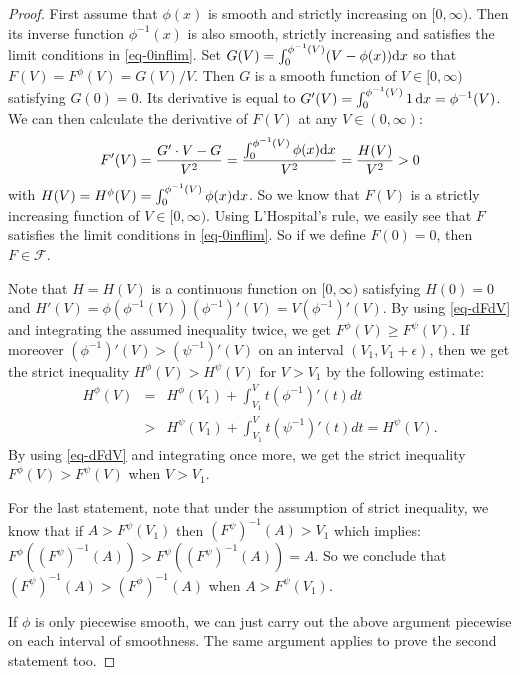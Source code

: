 \documentclass[12pt]{amsart}
\theoremstyle{definition}
\def\dif{{\rm d}}
\begin{document}
\begin{proof}
    First assume that $\phi(x)$ is smooth and strictly increasing on $[0, \infty)$. Then its inverse function $\phi^{-1}(x)$ is also smooth, strictly increasing and satisfies the limit conditions in \eqref{eq-0inflim}. 
    Set $G(V)=\int_0^{\phi^{-1}(V)}(V-\phi(x))\dif x$ so that $F(V)=F^{\phi}(V)=G(V)/V$. Then $G$ is a smooth function of $V\in [0, \infty)$ satisfying $G(0)=0$. Its derivative is equal to $G'(V)=\int_0^{\phi^{-1}(V)}1 \, \dif x=\phi^{-1}(V)$. We can then calculate the derivative of $F(V)$ at any $V\in (0, \infty)$: 
    \begin{equation}\label{eq-dFdV}
        F'(V)=\frac{G'\cdot V-G}{V^2}=\frac{\int_0^{\phi^{-1}(V)}\phi(x)\dif x}{V^2}=\frac{H(V)}{V^2}>0
    \end{equation}
    with $H(V)=H^\phi(V)=\int_0^{\phi^{-1}(V)}\phi(x)\dif x$. So we know that $F(V)$ is a strictly increasing function of $V\in [0, \infty)$. Using L'Hospital's rule, we easily see that $F$ satisfies the limit conditions in \eqref{eq-0inflim}. So if we define $F(0)=0$, then $F\in \mathscr{F}$.  
   
   Note that $H=H(V)$ is a continuous function on $[0, \infty)$ satisfying $H(0)=0$ and $H'(V)=\phi(\phi^{-1}(V))(\phi^{-1})'(V)=V (\phi^{-1})'(V)$. By using \eqref{eq-dFdV} and integrating the assumed inequality twice, we get
   $F^\phi(V)\ge F^\psi(V)$. If moreover $(\phi^{-1})'(V)>(\psi^{-1})'(V)$ on an interval $(V_1, V_1+\epsilon)$, then we get the strict inequality $H^\phi(V)>H^\psi(V)$ for $V>V_1$ by the following estimate:
   \begin{eqnarray*}
       H^\phi(V)&=&H^\phi(V_1)+\int_{V_1}^V t (\phi^{-1})'(t)dt \\
       &>& H^\psi(V_1)+\int_{V_1}^V t (\psi^{-1})'(t)dt=H^\psi(V). 
   \end{eqnarray*}
  By using \eqref{eq-dFdV} and integrating once more, we get the strict inequality $F^\phi(V)> F^\psi(V)$ when $V>V_1$. 
   
   For the last statement, note that under the assumption of strict inequality, we know that if $A>F^\psi(V_1)$ then $(F^\psi)^{-1}(A)>V_1$ which implies:
   $F^\phi((F^\psi)^{-1}(A))>F^\psi((F^\psi)^{-1}(A))=A$. So we conclude that $(F^\psi)^{-1}(A)>(F^\phi)^{-1}(A)$ when $A>F^\psi(V_1)$. 

   If $\phi$ is only piecewise smooth, we can just carry out the above argument piecewise on each interval of smoothness. The same argument applies to prove the second statement too. 
\end{proof}
\end{document}
